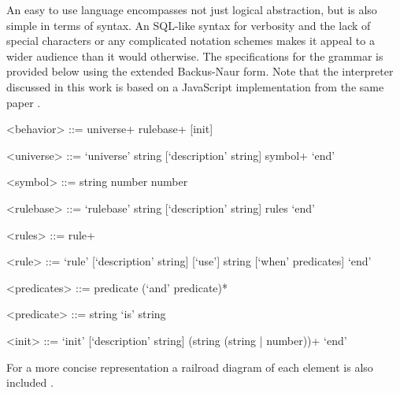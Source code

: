 An easy to use language encompasses not just logical abstraction, but is also simple in terms of syntax.
An SQL-like syntax for verbosity and the lack of special characters or any complicated notation schemes makes it appeal to a wider audience than it would otherwise. The specifications for the grammar is provided below using the extended Backus-Naur form. Note that the interpreter discussed in this work is based on a JavaScript implementation from the same paper \cite{pillerkovacs2015}.

\begin{grammar}
<behavior> ::= universe+ rulebase+ [init]

<universe> ::= `universe' string [`description' string] symbol+ `end'

<symbol> ::= string number number

<rulebase> ::= `rulebase' string [`description' string] rules `end'

<rules> ::= rule+

<rule> ::= `rule' [`description' string] [`use'] string [`when' predicates] `end'

<predicates> ::= predicate (`and' predicate)*

<predicate> ::= string `is' string

<init> ::= `init' [`description' string] (string (string | number))+ `end'
\end{grammar}

For a more concise representation a railroad diagram of each element is also included \cite{pillerkovacs2015}.

